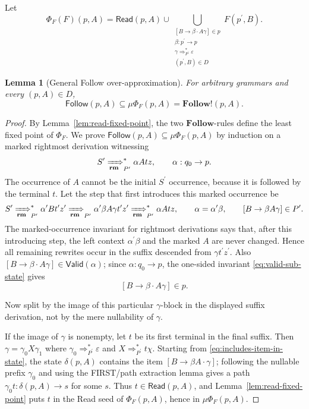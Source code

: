 \documentclass[11pt,a4paper]{article}
\theoremstyle{prettyplain}
\newtheorem{lemma}[theorem]{Lemma}
\theoremstyle{prettydef}
\newcommand{\eps}{\varepsilon}
\newcommand{\RMP}{\xRightarrow[\mathbf{rm}]{}_{P^\prime}}
\newcommand{\Path}[3]{#1:#2\to#3}
\newcommand{\Item}[2]{[#1\to #2]}
\newcommand{\Follow}{\mathbf{Follow}}
\begin{document}
Let
\[
\Phi_F(F)(p,A)
=
\mathsf{Read}(p,A)
\cup
\bigcup_{\substack{
  \Item{B}{\beta\cdot A\gamma}\in p\\
  \Path{\beta}{p^\prime}{p}\\
  \gamma\Rightarrow_{P^\prime}^*\eps\\
  (p^\prime,B)\in D}}
F(p^\prime,B).
\]

\begin{lemma}[General Follow over-approximation]\label{lem:follow-overapprox}
For arbitrary grammars and every \((p,A)\in D\),
\begin{equation}\label{eq:follow-overapprox}
\mathsf{Follow}(p,A)
\subseteq
\mu\Phi_F(p,A)
=
\Follow\mathbin{!}(p,A).
\end{equation}
\end{lemma}

\begin{proof}
By Lemma~\ref{lem:read-fixed-point}, the two \(\Follow\)-rules define the least
fixed point of \(\Phi_F\).  We prove
\(\mathsf{Follow}(p,A)\subseteq\mu\Phi_F(p,A)\) by induction on a marked
rightmost derivation witnessing
\[
S^\prime\RMP^*\alpha A t z,
\qquad
\Path{\alpha}{q_0}{p}.
\]
The occurrence of \(A\) cannot be the initial \(S^\prime\) occurrence, because it
is followed by the terminal \(t\).  Let the step that first introduces this
marked occurrence be
\[
S^\prime\RMP^*
\alpha^\prime B t^\prime z^\prime
\RMP
\alpha^\prime\beta A\gamma t^\prime z^\prime
\RMP^*
\alpha A t z,
\qquad
\alpha=\alpha^\prime\beta,
\qquad
\Item{B}{\beta A\gamma}\in P^\prime .
\]
The marked-occurrence invariant for rightmost derivations says that, after this
introducing step, the left context \(\alpha^\prime\beta\) and the marked \(A\)
are never changed.  Hence all remaining rewrites occur in the suffix descended
from \(\gamma t^\prime z^\prime\).  Also
\(\Item{B}{\beta\cdot A\gamma}\in\mathsf{Valid}(\alpha)\); since
\(\Path{\alpha}{q_0}{p}\), the one-sided invariant
\eqref{eq:valid-sub-state} gives
\begin{equation}\label{eq:includes-item-in-state}
\Item{B}{\beta\cdot A\gamma}\in p .
\end{equation}

Now split by the image of this particular \(\gamma\)-block in the displayed
suffix derivation, not by the mere nullability of \(\gamma\).

If the image of \(\gamma\) is nonempty, let \(t\) be its first terminal in the
final suffix.  Then
\(\gamma=\gamma_0X\gamma_1\) where
\(\gamma_0\Rightarrow_{P^\prime}^*\eps\) and
\(X\Rightarrow_{P^\prime}^*t\chi\).  Starting from
\eqref{eq:includes-item-in-state}, the state \(\delta(p,A)\) contains the item
\(\Item{B}{\beta A\cdot\gamma}\); following the nullable prefix \(\gamma_0\) and
using the FIRST/path extraction lemma gives a path
\(\Path{\gamma_0 t}{\delta(p,A)}{s}\) for some \(s\).  Thus
\(t\in\mathsf{Read}(p,A)\), and Lemma~\ref{lem:read-fixed-point} puts \(t\) in the
Read seed of \(\Phi_F(p,A)\), hence in \(\mu\Phi_F(p,A)\).


\end{proof}
\end{document}
